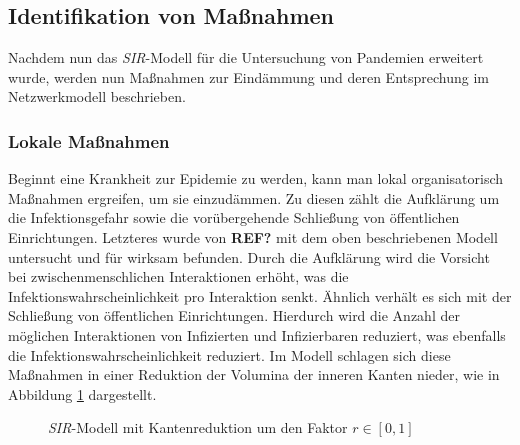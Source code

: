 \steffen\subsection{Identifikation von Maßnahmen}
Nachdem nun das \emph{SIR}-Modell für die Untersuchung von Pandemien erweitert wurde, werden nun Maßnahmen zur Eindämmung und deren Entsprechung im Netzwerkmodell beschrieben. 

\subsubsection{Lokale Maßnahmen}
Beginnt eine Krankheit zur Epidemie zu werden, kann man lokal organisatorisch Maßnahmen ergreifen, um sie einzudämmen. Zu diesen zählt die Aufklärung um die Infektionsgefahr sowie die vorübergehende Schließung von öffentlichen Einrichtungen. Letzteres wurde von \textbf{REF?} mit dem oben beschriebenen Modell untersucht und für wirksam befunden. Durch die Aufklärung wird die Vorsicht bei zwischenmenschlichen Interaktionen erhöht, was die Infektionswahrscheinlichkeit pro Interaktion senkt. Ähnlich verhält es sich mit der Schließung von öffentlichen Einrichtungen. Hierdurch wird die Anzahl der möglichen Interaktionen von Infizierten und Infizierbaren reduziert, was ebenfalls die Infektionswahrscheinlichkeit reduziert. Im Modell schlagen sich diese Maßnahmen in einer Reduktion der Volumina der inneren Kanten nieder, wie in Abbildung \ref{fig:ssec:actions:local} dargestellt.

\begin{figure}
\begin{center}
\end{center}
\caption{\emph{SIR}-Modell mit Kantenreduktion um den Faktor $r\in[0,1]$}\label{fig:ssec:actions:local}
\end{figure}


